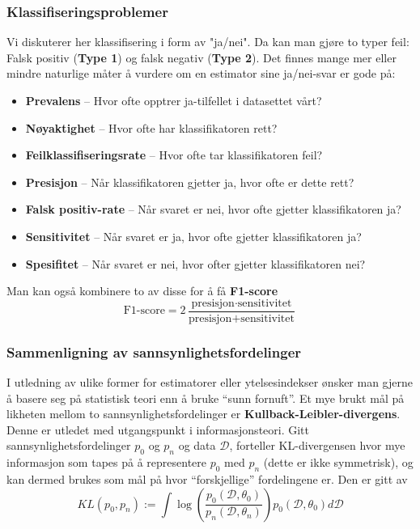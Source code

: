 \subsubsection{Klassifiseringsproblemer}
Vi diskuterer her klassifisering i form av "ja/nei". Da kan man gjøre to typer feil: Falsk positiv (\textbf{Type 1}) og falsk negativ (\textbf{Type 2}). Det finnes mange mer eller mindre naturlige måter å vurdere om en estimator sine ja/nei-svar er gode på:

\begin{itemize}
\item \textbf{Prevalens} -- Hvor ofte opptrer ja-tilfellet i datasettet vårt?
\item \textbf{Nøyaktighet} -- Hvor ofte har klassifikatoren rett?
\item \textbf{Feilklassifiseringsrate} -- Hvor ofte tar klassifikatoren feil?
\item \textbf{Presisjon} -- Når klassifikatoren gjetter ja, hvor ofte er dette rett?
\item \textbf{Falsk positiv-rate} -- Når svaret er nei, hvor ofte gjetter klassifikatoren ja?
\item \textbf{Sensitivitet} -- Når svaret er ja, hvor ofte gjetter klassifikatoren ja?
\item \textbf{Spesifitet} -- Når svaret er nei, hvor ofter gjetter klassifikatoren nei?
\end{itemize}

Man kan også kombinere to av disse for å få \textbf{F1-score}
\begin{equation}
\textrm{F1-score} = 2 \frac{\textrm{presisjon} \cdot \textrm{
sensitivitet}}{\textrm{presisjon} + \textrm{
sensitivitet}}
\end{equation}

\subsubsection{Sammenligning av sannsynlighetsfordelinger}
I utledning av ulike former for estimatorer eller ytelsesindekser ønsker man gjerne å basere seg på statistisk teori enn å bruke ``sunn fornuft''. Et mye brukt mål på likheten mellom to sannsynlighetsfordelinger er \textbf{Kullback-Leibler-divergens}. Denne er utledet med utgangspunkt i informasjonsteori. Gitt sannsynlighetsfordelinger $p_0$ og $p_n$ og data $\mathcal{D}$, forteller KL-divergensen hvor mye informasjon som tapes på å representere $p_0$ med $p_n$ (dette er ikke symmetrisk), og kan dermed brukes som mål på hvor ``forskjellige'' fordelingene er. Den er gitt av
\begin{equation}
		K L\left(p_{0}, p_{n}\right):=\int \log \left(\frac{p_{0}\left({\mathcal{D}}, \theta_{0}\right)}{p_{n}\left({\mathcal{D}}, \theta_{n}\right)}\right) p_{0}\left({\mathcal{D}}, \theta_{0}\right) d {\mathcal{D}}
\end{equation}


